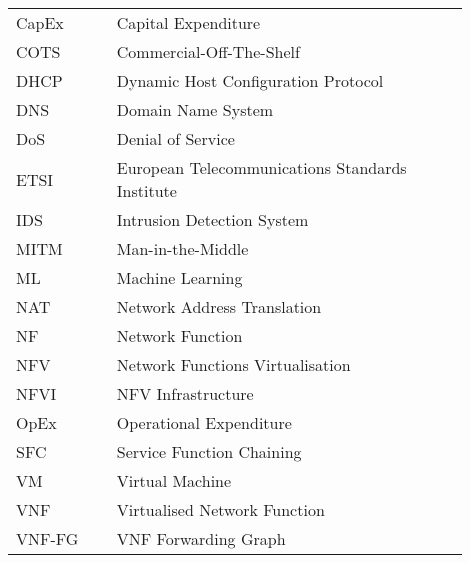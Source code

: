 

\begin{listaacron}

\begin{longtable}[l]{p{0.2\linewidth}p{0.7\linewidth}}


CapEx & Capital Expenditure\\
COTS & Commercial-Off-The-Shelf\\
DHCP & Dynamic Host Configuration Protocol\\
DNS & Domain Name System\\
DoS & Denial of Service\\
ETSI & European Telecommunications Standards Institute\\
IDS & Intrusion Detection System\\
MITM & Man-in-the-Middle\\
ML & Machine Learning\\
NAT & Network Address Translation\\
NF & Network Function\\
NFV & Network Functions Virtualisation \\
NFVI & NFV Infrastructure \\
OpEx & Operational Expenditure\\
SFC & Service Function Chaining\\
VM & Virtual Machine\\
VNF & Virtualised Network Function\\
VNF-FG & VNF Forwarding Graph\\
\end{longtable}

\end{listaacron}

